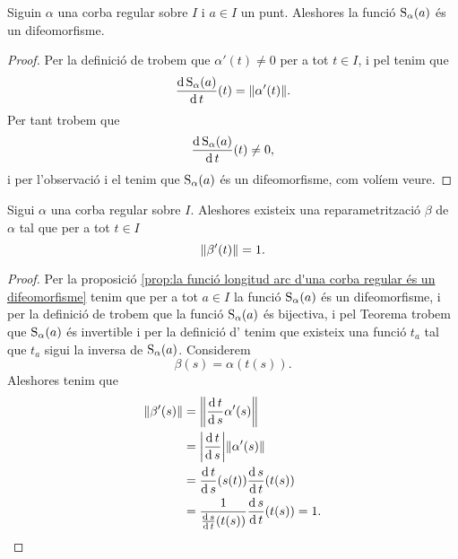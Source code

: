 \documentclass[../../Main.tex]{subfiles}
\begin{document}
	\begin{proposition}
		\label{prop:la funció longitud arc d'una corba regular és un difeomorfisme}
		Siguin \(\alpha\) una corba regular sobre \(I\) i \(a\in I\) un punt. Aleshores la funció \(\operatorname{S}_{\alpha}(a)\) és un difeomorfisme. %
		\begin{proof}
			Per la definició de  trobem que \(\alpha'(t)\neq0\) per a tot \(t\in I\), i pel  tenim que
			\[\frac{\diff\funciolongituddarc_{\alpha}(a)}{\diff t}(t)=\norm{\alpha'(t)}.\]
			Per tant trobem que %
			\[\frac{\operatorname{d}\operatorname{S}_{\alpha}(a)}{\operatorname{d} t}(t)\neq0,\]
			i per l'observació  i el \corollari{}  tenim que \(\operatorname{S}_{\alpha}(a)\) és un difeomorfisme, com volíem veure. %
		\end{proof}
	\end{proposition}
	\begin{proposition} %
		\label{prop:podem trobar una reparametrització amb velocitat unitaria de qualsevol corba regular}
		Sigui \(\alpha\) una corba regular sobre \(I\). Aleshores existeix una reparametrització \(\beta\) de \(\alpha\) tal que per a tot \(t\in I\)
		\[\norm{\beta'(t)}=1.\]
		\begin{proof}
			Per la proposició \ref{prop:la funció longitud arc d'una corba regular és un difeomorfisme} tenim que per a tot \(a\in I\) la funció \(\operatorname{S}_{\alpha}(a)\) és un difeomorfisme, i per la definició de  trobem que la funció \(\operatorname{S}_{\alpha}(a)\) és bijectiva, i pel Teorema  trobem que \(\operatorname{S}_{\alpha}(a)\) és invertible i per la definició d' tenim que existeix una funció \(t_{a}\) tal que \(t_{a}\) sigui la inversa de \(\operatorname{S}_{\alpha}(a)\). Considerem
			\[\beta(s)=\alpha(t(s)).\]
			Aleshores tenim que
			\begin{align*} %
				\norm{\beta'(s)}&=\norm{\frac{\diff t}{\diff s}\alpha'(s)} \\
				&=\abs{\frac{\diff t}{\diff s}}\norm{\alpha'(s)} \\
				&=\frac{\diff t}{\diff s}(s(t))\frac{\diff s}{\diff t}(t(s))\\
				&=\frac{1}{\frac{\diff s}{\diff t}(t(s))}\frac{\diff s}{\diff t}(t(s))=1. \qedhere
			\end{align*}
		\end{proof}
	\end{proposition}
\end{document}
